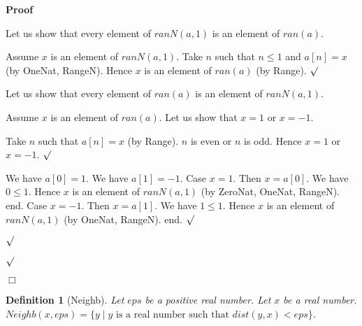 \documentclass{article}
\newenvironment{forthel}{\begin{leftbar}}{\end{leftbar}}
\newenvironment{proof}{\noindent\textbf{Proof\ }}{\hspace*{\fill}$\Box$\medskip}
\newenvironment{subproof}{\begin{list}{}{}
		\item[\text{Proof}]}{\hfill $\surd$ \end{list}}
\newtheorem{definition}{Definition}
\begin{document}
\begin{forthel}
\begin{proof}
\begin{subproof}
\begin{subproof}
	Let us show that every element of $ranN(a,1)$ is an element of $ran(a)$.
	\begin{subproof}
	Assume $x$ is an element of $ranN(a,1)$.
	Take $n$ such that $n \leq 1$ and $a[n] = x$ (by OneNat, RangeN).
	Hence $x$ is an element of $ran(a)$ (by Range).
	\end{subproof}
	Let us show that every element of $ran(a)$ is an element of $ranN(a,1)$.
	\begin{subproof}
	Assume $x$ is an element of $ran(a)$.
	Let us show that $x = 1$ or $x = -1$.
	\begin{subproof}
	Take $n$ such that $a[n] = x$ (by Range).
	$n$ is even or $n$ is odd.
	Hence $x = 1$ or $x = -1$.
	\end{subproof}
	We have $a[0] = 1$.
	We have $a[1] = -1$.
	Case $x = 1$.
	Then $x = a[0]$.
	We have $0 \leq 1$.
	Hence $x$ is an element of $ranN(a,1)$ (by ZeroNat, OneNat, RangeN).
	end.
	Case $x = -1$.
	Then $x = a[1]$.
	We have $1 \leq 1$.
	Hence $x$ is an element of $ranN(a,1)$ (by OneNat, RangeN).
	end.
	\end{subproof}
	\end{subproof}
	\end{subproof}
	\end{proof}
	
	\begin{definition}[Neighb]
	Let $eps$ be a positive real number. Let $x$ be a real number.
	$Neighb(x,eps) = \{y \mid y \text{ is a real number such that } dist(y,x) < eps\}$.
	\end{definition}
	

\end{forthel}
\end{document}
